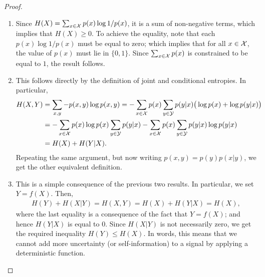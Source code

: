         \begin{proof}
            \begin{enumerate}[label=(\alph*)]
                \item Since $H(X) = \sum_{x \in \mathcal{X}} p(x) \log 1/p(x)$, it is a sum of non-negative terms, which implies that $H(X) \geq 0$. To achieve the equality, note that each $p(x) \log 1/p(x)$ must be equal to zero; which implies that for all $x \in \mathcal{X}$, the value of $p(x)$ must lie in $\{0, 1\}$. Since $\sum_{x \in \mathcal{X}} p(x)$ is constrained to be equal to $1$, the result follows. 
                
                \item This follows directly by the definition of joint and conditional entropies. In particular, 
                \begin{align}
                    H(X, Y) &= \sum_{x, y} -p(x, y) \log p(x,y) = -\sum_{x \in \mathcal{X}} p(x) \sum_{y \in \mathcal{Y}} p(y|x) \big( \log p(x) + \log p(y|x) \big)  \\
                    & = - \sum_{x \in \mathcal{X}} p(x) \log p(x) \sum_{y \in \mathcal{Y}} p(y|x) - \sum_{x \in \mathcal{X}} p(x) \sum_{y \in \mathcal{Y}} p(y|x) \log p(y|x) \\
                    & = H(X) + H(Y|X). 
                \end{align}
                Repeating the same argument, but now writing $p(x, y) = p(y) p(x|y)$, we get the other equivalent definition. 
                \item This is a simple consequence of the previous two results. In particular, we set $Y = f(X)$. Then, 
                \begin{align}
                    H(Y) + H(X|Y) = H(X, Y) = H(X) + H(Y|X) = H(X), 
                \end{align}
                where the last equality is a consequence of the fact that $Y = f(X)$; and hence $H(Y|X)$ is equal to $0$. Since $H(X|Y)$ is not necessarily zero, we get the required inequality $H(Y) \leq H(X)$. In words, this means that we cannot add more uncertainty (or self-information) to a signal by applying a deterministic function. 
            \end{enumerate}
        \end{proof}

